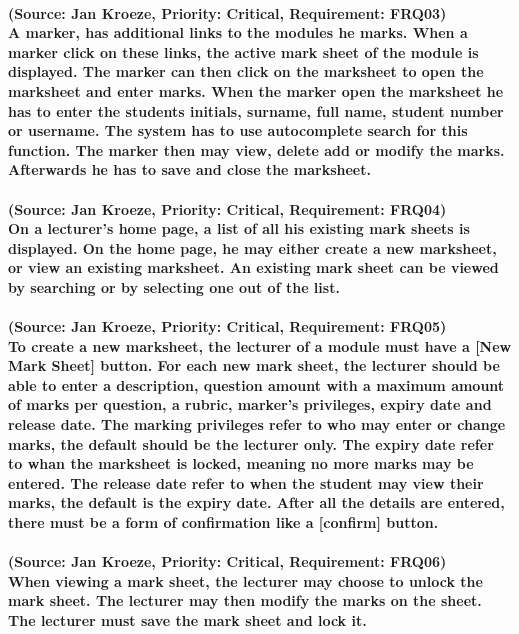 \documentclass[12pt]{article}
\begin{document}
  \paragraph{(Source: Jan Kroeze, Priority: Critical, Requirement: FRQ03) \\
  A marker, has additional links to the modules he marks. When a marker click on these links, the active mark sheet of the module is displayed. The marker can then click on the marksheet to open the marksheet and enter marks. When the marker open the marksheet he has to enter the students initials, surname, full name, student number or username. The system has to use autocomplete search for this function. The marker then may view, delete add or modify the marks. Afterwards he has to save and close the marksheet.}
  \paragraph{(Source: Jan Kroeze, Priority: Critical, Requirement: FRQ04) \\
  On a lecturer's home page, a list of all his existing mark sheets is displayed. On the home page, he may either create a new marksheet, or view an existing marksheet. An existing mark sheet can be viewed by searching or by selecting one out of the list.}
  \paragraph{(Source: Jan Kroeze, Priority: Critical, Requirement: FRQ05) \\
  To create a new marksheet, the lecturer of a module must have a [New Mark Sheet] button. For each new mark sheet, the lecturer should be able to enter a description, question amount with a maximum amount of marks per question, a rubric, marker's privileges, expiry date and release date. The marking privileges refer to who may enter or change marks, the default should be the lecturer only. The expiry date refer to whan the marksheet is locked, meaning no more marks may be entered. The release date refer to when the student may view their marks, the default is the expiry date. After all the details are entered, there must be a form of confirmation like a [confirm] button.}
  \paragraph{(Source: Jan Kroeze, Priority: Critical, Requirement: FRQ06) \\
  When viewing a mark sheet, the lecturer may choose to unlock the mark sheet. The lecturer may then modify the marks on the sheet. The lecturer must save the mark sheet and lock it. }
\end{document}
